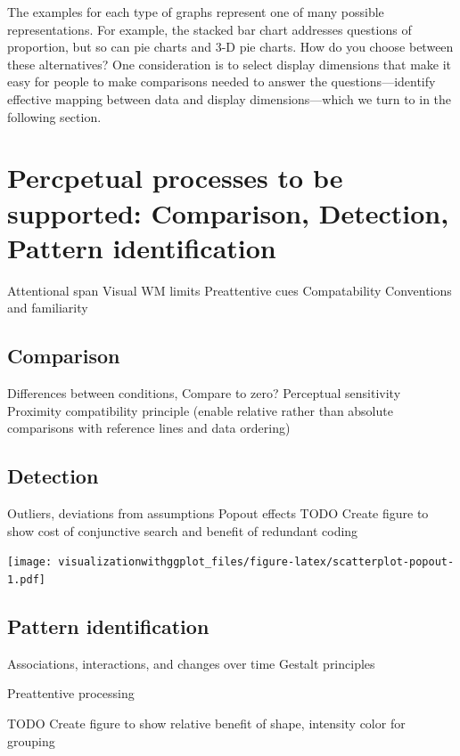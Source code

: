 \documentclass[]{krantz}
\theoremstyle{definition}
\theoremstyle{definition}
\theoremstyle{definition}
\theoremstyle{remark}
\begin{document}
The examples for each type of graphs represent one of many possible
representations. For example, the stacked bar chart addresses questions
of proportion, but so can pie charts and 3-D pie charts. How do you
choose between these alternatives? One consideration is to select
display dimensions that make it easy for people to make comparisons
needed to answer the questions---identify effective mapping between data
and display dimensions---which we turn to in the following section.

\section{Percpetual processes to be supported: Comparison, Detection,
Pattern
identification}\label{percpetual-processes-to-be-supported-comparison-detection-pattern-identification}

Attentional span Visual WM limits Preattentive cues Compatability
Conventions and familiarity

\subsection{Comparison}\label{comparison}

Differences between conditions, Compare to zero? Perceptual sensitivity
Proximity compatibility principle (enable relative rather than absolute
comparisons with reference lines and data ordering)

\subsection{Detection}\label{detection}

Outliers, deviations from assumptions Popout effects TODO Create figure
to show cost of conjunctive search and benefit of redundant coding

\texttt{[image: visualizationwithggplot\_files/figure-latex/scatterplot-popout-1.pdf]}

\subsection{Pattern identification}\label{pattern-identification}

Associations, interactions, and changes over time Gestalt principles

Preattentive processing

TODO Create figure to show relative benefit of shape, intensity color
for grouping
\end{document}
